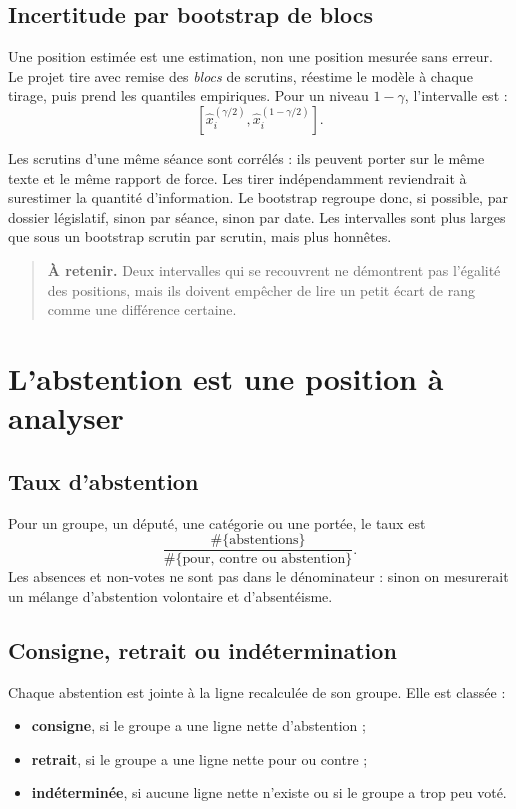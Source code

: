 \documentclass[11pt,a4paper]{article}
\newcommand{\important}[1]{\begin{quote}\small\color{blue!55!black}\textbf{À retenir.} #1\end{quote}}
\begin{document}
\subsection{Incertitude par bootstrap de blocs}

\label{sec:bootstrap}
Une position estimée est une estimation, non une position mesurée sans erreur.
Le projet tire avec remise des \emph{blocs} de scrutins, réestime le modèle à
chaque tirage, puis prend les quantiles empiriques. Pour un niveau $1-\gamma$,
l'intervalle est :
\[
 [\widehat x_i^{(\gamma/2)},\widehat x_i^{(1-\gamma/2)}].
\]

Les scrutins d'une même séance sont corrélés : ils peuvent porter sur le même
texte et le même rapport de force. Les tirer indépendamment reviendrait à
surestimer la quantité d'information. Le bootstrap regroupe donc, si possible,
par dossier législatif, sinon par séance, sinon par date. Les intervalles sont
plus larges que sous un bootstrap scrutin par scrutin, mais plus honnêtes.

\important{Deux intervalles qui se recouvrent ne démontrent pas l'égalité des
positions, mais ils doivent empêcher de lire un petit écart de rang comme une
différence certaine.}

\section{L'abstention est une position à analyser}\label{sec:abstention}

\subsection{Taux d'abstention}

Pour un groupe, un député, une catégorie ou une portée, le taux est
\[
 \frac{\#\{\text{abstentions}\}}
 {\#\{\text{pour, contre ou abstention}\}}.
\]
Les absences et non-votes ne sont pas dans le dénominateur : sinon on mesurerait
un mélange d'abstention volontaire et d'absentéisme.

\subsection{Consigne, retrait ou indétermination}

Chaque abstention est jointe à la ligne recalculée de son groupe. Elle est
classée :

\begin{itemize}
  \item \textbf{consigne}, si le groupe a une ligne nette d'abstention ;
  \item \textbf{retrait}, si le groupe a une ligne nette pour ou contre ;
  \item \textbf{indéterminée}, si aucune ligne nette n'existe ou si le groupe a
  trop peu voté.
\end{itemize}
\end{document}
